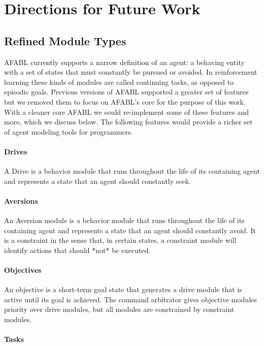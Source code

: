 \section{Directions for Future Work}


\subsection{Refined Module Types}

AFABL currently supports a narrow definition of an agent: a behaving entity with a set of states that must constantly be pursued or avoided. In reinforcement learning these kinds of modules are called continuing tasks, as opposed to episodic goals. Previous versions of AFABL supported a greater set of features but we removed them to focus on AFABL's core for the purpose of this work. With a cleaner core AFABL we could re-implement some of these features and more, which we discuss below. The following features would provide a richer set of agent modeling tools for programmers.

\paragraph{Drives}

A Drive is a behavior module that runs throughout the life of its containing agent and represents a state that an agent should constantly seek.

\paragraph{Aversions}

An Aversion module is a behavior module that runs throughout the life of its containing agent and represents a state that an agent should constantly avoid.  It is a constraint in the sense that, in certain states, a constraint module will identify actions that should *not* be executed.

\paragraph{Objectives}

An objective is a short-term goal state that generates a drive module that is active until its goal is achieved.  The command arbitrator gives objective modules priority over drive modules, but all modules are constrained by constraint modules.

\paragraph{Tasks}

